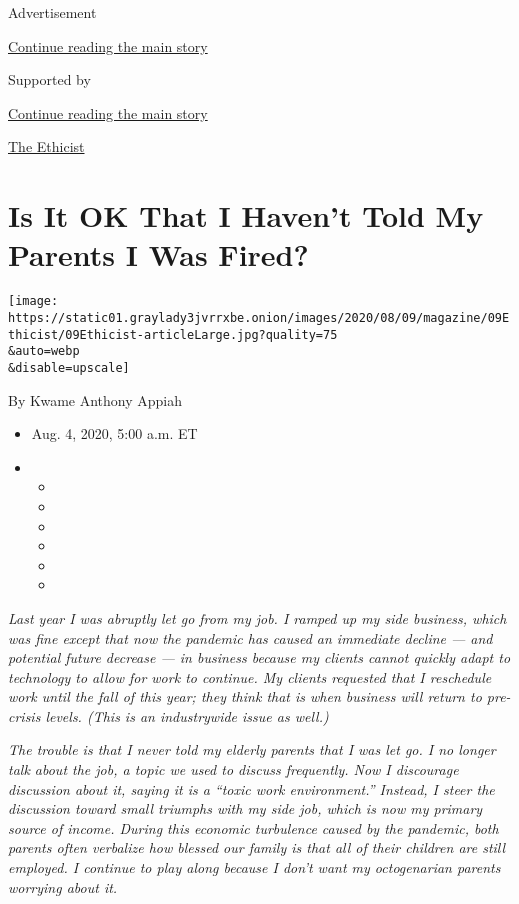 Advertisement

\protect\hyperlink{after-top}{Continue reading the main story}

Supported by

\protect\hyperlink{after-sponsor}{Continue reading the main story}

\href{/column/the-ethicist}{The Ethicist}

\hypertarget{is-it-ok-that-i-havent-told-my-parents-i-was-fired}{%
\section{Is It OK That I Haven't Told My Parents I Was
Fired?}\label{is-it-ok-that-i-havent-told-my-parents-i-was-fired}}

\texttt{[image: https://static01.graylady3jvrrxbe.onion/images/2020/08/09/magazine/09Ethicist/09Ethicist-articleLarge.jpg?quality=75\\\&auto=webp\\\&disable=upscale]}

By Kwame Anthony Appiah

\begin{itemize}
\item
  Aug. 4, 2020, 5:00 a.m. ET
\item
  \begin{itemize}
  \item
  \item
  \item
  \item
  \item
  \item
  \end{itemize}
\end{itemize}

\emph{Last year I was abruptly let go from my job. I ramped up my side
business, which was fine except that now the pandemic has caused an
immediate decline --- and potential future decrease --- in business
because my clients cannot quickly adapt to technology to allow for work
to continue. My clients requested that I reschedule work until the fall
of this year; they think that is when business will return to pre-crisis
levels. (This is an industrywide issue as well.)}

\emph{The trouble is that I never told my elderly parents that I was let
go. I no longer talk about the job, a topic we used to discuss
frequently. Now I discourage discussion about it, saying it is a ``toxic
work environment.'' Instead, I steer the discussion toward small
triumphs with my side job, which is now my primary source of income.
During this economic turbulence caused by the pandemic, both parents
often verbalize how blessed our family is that all of their children are
still employed. I continue to play along because I don't want my
octogenarian parents worrying about it.}

